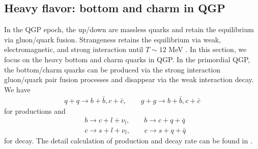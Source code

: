 \documentclass[universe,article,submit,moreauthors,pdftex,a4paper]{Definitions/mdpi}
\begin{document}
\subsection{Heavy flavor: bottom and charm in QGP}
\noindent In the QGP epoch, the up/down are massless quarks and retain the equilibrium via gluon/quark fusion. Strangeness retains the equilibrium via weak, electromagnetic, and strong interaction until $T\sim12$ MeV \cite{Yang:2021bko}. In this section, we focus on the heavy bottom and charm quarks in QGP. In the primordial QGP, the bottom/charm quarks can be produced via the strong interaction gluon/quark pair fusion processes and disappear via the weak interaction decay. We have
\begin{align}
    q+q\longrightarrow b+\bar b, c+\bar c,\qquad g+g\longrightarrow b+\bar b, c+\bar c
\end{align}
for productions and 
\begin{align}
    &b\longrightarrow c+l+\nu_l, \qquad b\longrightarrow c+q+\bar{q}\\
&c\longrightarrow s+l+\nu_l,\qquad c\longrightarrow s+q+\bar{q}
\end{align}
for decay. The detail calculation of production and decay rate can be found in \cite{Yang:2020nne,Yang:2023bot}.
\end{document}
